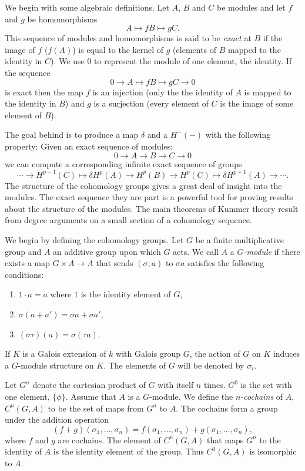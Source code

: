 We begin with some algebraic definitions.  Let $A$, $B$ and $C$ be
modules and let $f$ and $g$ be homomorphisms
\[
A \mapsto{f} B \mapsto{g} C.
\]
This sequence of modules and homomorphisms is said to be {\em exact} at $B$
if the image of $f$ ($f(A)$) is equal to the kernel of $g$ (elements of $B$
mapped to the identity in $C$). We use $0$ to
represent the module of one element, the identity.  If the sequence
\[
0 \longrightarrow A \mapsto{f} B \mapsto{g} C \longrightarrow 0
\]
is exact then the map $f$ is an injection (only the the identity of $A$
is mapped to the identity in $B$) and $g$ is a surjection (every element
of $C$ is the image of some element of $B$).

\medskip 
The goal behind  is to produce a map $\delta$ and
a  $H^{-}(-)$ with the following property: Given an
exact sequence of modules:
\[
0 \longrightarrow A \longrightarrow B \longrightarrow C \longrightarrow 0
\]
we can compute a corresponding infinite exact sequence of groups
\[
 \cdots \longrightarrow H^{p-1}(C) \mapsto{\delta} H^p(A) \longrightarrow
H^p(B) \longrightarrow H^p(C) \mapsto{\delta} H^{p+1}(A)
\longrightarrow \cdots.
\]
The structure of the cohomology groups gives a great deal of insight into
the modules.  The exact sequence they are part is a powerful tool for
proving results about the structure of the modules.  The main theorems of
Kummer theory result from degree arguments on a small section of a
cohomology sequence.

We begin by defining the cohomology groups.  Let $G$ be a finite
multiplicative group and $A$ an additive group upon which $G$ acts.  We
call $A$ a {\em $G$-module} if there exists a map $G \times A \rightarrow
A$ that sends $(\sigma, a)$ to $\sigma a$ satisfies the following
conditions:

\begin{enumerate}
\item $1 \cdot a = a$ where $1$ is the identity element of $G$,
\item $\sigma(a + a') = \sigma a + \sigma a'$,
\item $(\sigma \tau)(a) = \sigma(\tau a)$.
\end{enumerate}

If $K$ is a Galois extension of $k$ with Galois group $G$, the action of
$G$ on $K$ induces a $G$-module structure on $K$.  The elements of $G$ will
be denoted by $\sigma_i$.

Let $G^n$ denote the cartesian product of $G$ with itself $n$ times.
$G^0$ is the set with one element, $\{\phi\}$.  Assume that $A$ is a
$G$-module.  We define the {\em
$n$-cochains} of $A$, $C^n(G, A)$ to be 
the set of maps from $G^n$ to $A$.  The cochains form a group under
the addition operation
\[
(f + g)(\sigma_1, \ldots, \sigma_n) = 
f(\sigma_1, \ldots, \sigma_n) + g(\sigma_1, \ldots, \sigma_n),
\]
where $f$ and $g$ are cochains.  The element of $C^n(G, A)$ that maps
$G^n$ to the identity of $A$ is the identity element of the group.  
Thus $C^0(G, A)$ is isomorphic to $A$.

